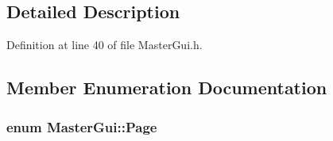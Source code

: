 \subsection{Detailed Description}


Definition at line 40 of file Master\-Gui.\-h.



\subsection{Member Enumeration Documentation}
\hypertarget{class_master_gui_af69d22eb6d94d0c4f1291814e56f3d9f}{
\subsubsection[{Page}]{\setlength{\rightskip}{0pt plus 5cm}enum {\bf Master\-Gui\-::\-Page}\hspace{0.3cm}{\ttfamily [private]}}}\label{class_master_gui_af69d22eb6d94d0c4f1291814e56f3d9f}
